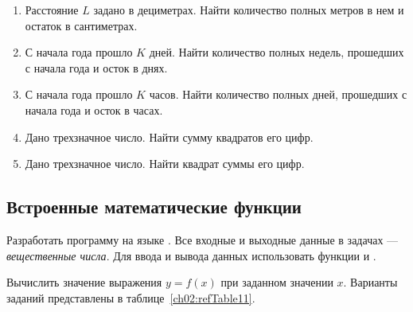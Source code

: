 \begin{enumerate}
\item Расстояние $L$ задано в дециметрах. Найти количество полных метров в нем и остаток в
сантиметрах.
\item С начала года прошло $K$ дней. Найти количество полных недель, прошедших с начала года и осток в
днях.
\item С начала года прошло $K$ часов. Найти количество полных дней, прошедших с начала года и осток в
часах.
\item Дано трехзначное число. Найти сумму квадратов его цифр.
\item Дано трехзначное число. Найти квадрат суммы его цифр.
\end{enumerate}

\subsection[Встроенные математические функции]{Встроенные математические функции}
Разработать программу на языке . Все входные и выходные данные в задачах --- \emph{вещественные числа}.
Для ввода и вывода данных использовать функции  и .

Вычислить значение выражения $y=f(x)$ при заданном значении
$x$. Варианты заданий представлены в таблице~\ref{ch02:refTable11}.
\clearpage

